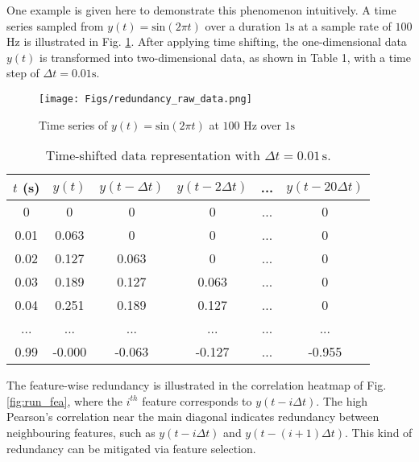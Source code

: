 \documentclass{article}
\begin{document}
One example is given here to demonstrate this phenomenon intuitively. 
A time series sampled from $y(t) = \text{sin}(2 \pi t)$ over a duration $1 \text{s}$ at a sample rate of $100$ Hz is illustrated in Fig. \ref{fig:run_raw}. 
After applying time shifting,  the one-dimensional data $y(t)$ is transformed into two-dimensional data, as shown in Table 1, with a time step of $\Delta t = 0.01 \text{s}$.

\begin{figure}[htpb]
    \centering
    \texttt{[image: Figs/redundancy\_raw\_data.png]}
    \caption{Time series of $y(t) = \text{sin}(2 \pi t)$ at $100$ Hz over $1 \text{s}$}
    \label{fig:run_raw}
\end{figure}

\begin{table}[htpb]
\centering
\begin{tabular}{|c|c|c|c|c|c|}
\hline
$t$ (s) & $y(t)$  & $y(t-\Delta t)$ & $y(t-2\Delta t)$  & ... & $y(t-20\Delta t)$ \\ \hline
0                 & 0       & 0               & 0        & ... & 0                 \\ \hline
0.01              & 0.063   & 0               & 0        & ... & 0                 \\ \hline
0.02              & 0.127   & 0.063           & 0        & ... & 0                 \\ \hline
0.03              & 0.189   & 0.127           & 0.063    & ... & 0                 \\ \hline
0.04              & 0.251   & 0.189           & 0.127    & ... & 0                 \\ \hline
...               & ...     & ...             & ...      & ... & ...               \\ \hline
0.99              & -0.000  & -0.063          & -0.127   & ... & -0.955            \\ \hline
\end{tabular}
\caption{Time-shifted data representation with $\Delta t = 0.01 \, \text{s}$.}
\end{table}

The feature-wise redundancy is illustrated in the correlation heatmap of Fig. \ref{fig:run_fea}, where the $i^{th}$ feature corresponds to $y(t-i\Delta t)$. 
The high Pearson's correlation near the main diagonal indicates redundancy between neighbouring features, such as $y(t-i\Delta t)$ and $y(t-(i+1)\Delta t)$.
This kind of redundancy can be mitigated via feature selection.
\end{document}
